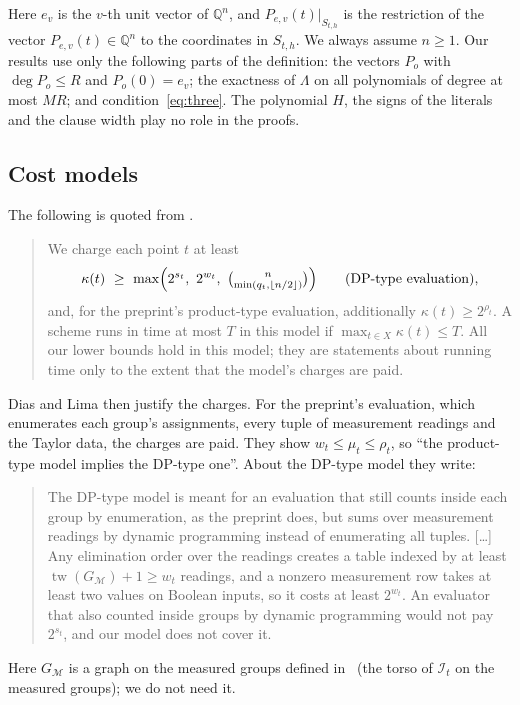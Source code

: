 \documentclass[11pt,a4paper]{article}
\theoremstyle{definition}
\theoremstyle{remark}
\newcommand{\Q}{\mathbb{Q}}
\newcommand{\cI}{\mathcal{I}}
\newcommand{\tw}{\operatorname{tw}}
\begin{document}
Here $e_v$ is the $v$-th unit vector of $\Q^n$, and $P_{e,v}(t)|_{S_{t,h}}$ is the restriction
of the vector $P_{e,v}(t)\in\Q^n$ to the coordinates in $S_{t,h}$. We always assume $n\ge1$.
Our results use only the following parts of the definition: the vectors $P_o$ with
$\deg P_o\le R$ and $P_o(0)=e_v$; the exactness of $\Lambda$ on all polynomials of degree at
most $MR$; and condition~\eqref{eq:three}. The polynomial $H$, the signs of the literals and
the clause width play no role in the proofs.

\subsection{Cost models}\label{sec:cost}

The following is quoted from \cite[Section~5.2]{DL}.

\begin{quote}
We charge each point $t$ at least
\[
\kappa(t)\ \ge\ \max\Bigl(2^{s_t},\ 2^{w_t},\ \tbinom{n}{\min(q_t,\lfloor n/2\rfloor)}\Bigr)
\qquad\text{(DP-type evaluation)},
\]
and, for the preprint's product-type evaluation, additionally $\kappa(t)\ge2^{\rho_t}$. A
scheme runs in time at most $T$ in this model if $\max_{t\in X}\kappa(t)\le T$. All our lower
bounds hold in this model; they are statements about running time only to the extent that the
model's charges are paid.
\end{quote}

Dias and Lima then justify the charges. For the preprint's evaluation, which enumerates each
group's assignments, every tuple of measurement readings and the Taylor data, the charges are
paid. They show $w_t\le\mu_t\le\rho_t$, so ``the product-type model implies the DP-type
one''. About the DP-type model they write:

\begin{quote}
The DP-type model is meant for an evaluation that still counts inside each group by
enumeration, as the preprint does, but sums over measurement readings by dynamic programming
instead of enumerating all tuples. [\dots] Any elimination order over the readings creates a
table indexed by at least $\tw(G_{\mathcal M})+1\ge w_t$ readings, and a nonzero measurement
row takes at least two values on Boolean inputs, so it costs at least $2^{w_t}$. An evaluator
that also counted inside groups by dynamic programming would not pay $2^{s_t}$, and our model
does not cover it.
\end{quote}

Here $G_{\mathcal M}$ is a graph on the measured groups defined in~\cite{DL} (the torso of
$\cI_t$ on the measured groups); we do not need it.
\end{document}
